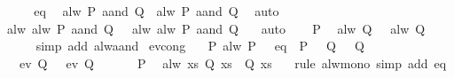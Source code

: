 \begin{isabellebody}
\isamarkupfalse%
\ {\isacharminus}\isanewline
\ \ \isamarkupfalse%
\ eq\ \isamarkupfalse%
\ {\isachardoublequoteopen}{\isacharparenleft}alw\ P\ aand\ Q{}{\isacharparenright}\ {\isacharequal}\ {\isacharparenleft}alw\ P\ aand\ Q{}{\isacharparenright}{\isachardoublequoteclose}\ \isamarkupfalse%
\ auto\isanewline
\ \ \isamarkupfalse%
\ \isamarkupfalse%
\ {\isachardoublequoteopen}alw\ {\isacharparenleft}alw\ P\ aand\ Q{}{\isacharparenright}\ {\isasymomega}\ {\isacharequal}\ alw\ {\isacharparenleft}alw\ P\ aand\ Q{}{\isacharparenright}\ {\isasymomega}{\isachardoublequoteclose}\ \isamarkupfalse%
\ auto\isanewline
\ \ \isamarkupfalse%
\ P\ \isamarkupfalse%
\ {\isachardoublequoteopen}alw\ Q{}\ {\isasymomega}\ {\isasymlongleftrightarrow}\ alw\ Q{}\ {\isasymomega}{\isachardoublequoteclose}\isanewline
\ \ \ \ \isamarkupfalse%
\ {\isacharparenleft}simp\ add{\isacharcolon}\ alw{\isacharunderscore}aand{\isacharparenright}\isanewline
{}\isamarkupfalse%
%
\endisatagproof
{\isafoldproof}%
%
\isadelimproof
\isanewline
%
\endisadelimproof
\isanewline
{}\isamarkupfalse%
\ ev{\isacharunderscore}cong{\isacharcolon}\isanewline
\ \ \ P{\isacharcolon}\ {\isachardoublequoteopen}alw\ P\ {\isasymomega}{\isachardoublequoteclose}\ \ eq{\isacharcolon}\ {\isachardoublequoteopen}{\isasymAnd}{\isasymomega}{\isachardot}\ P\ {\isasymomega}\ {\isasymLongrightarrow}\ Q{}\ {\isasymomega}\ {\isasymlongleftrightarrow}\ Q{}\ {\isasymomega}{\isachardoublequoteclose}\isanewline
\ \ \ {\isachardoublequoteopen}ev\ Q{}\ {\isasymomega}\ {\isasymlongleftrightarrow}\ ev\ Q{}\ {\isasymomega}{\isachardoublequoteclose}\isanewline
%
\isadelimproof
%
\endisadelimproof
%
\isatagproof
{}\isamarkupfalse%
\ {\isacharminus}\isanewline
\ \ \isamarkupfalse%
\ P\ \isamarkupfalse%
\ {\isachardoublequoteopen}alw\ {\isacharparenleft}{\isasymlambda}xs{\isachardot}\ Q{}\ xs\ {\isasymlongrightarrow}\ Q{}\ xs{\isacharparenright}\ {\isasymomega}{\isachardoublequoteclose}\ \isamarkupfalse%
\ {\isacharparenleft}rule\ alw{\isacharunderscore}mono{\isacharparenright}\ {\isacharparenleft}simp\ add{\isacharcolon}\ eq{\isacharparenright}\isanewline
\ \ \isamarkupfalse%

\end{isabellebody}
